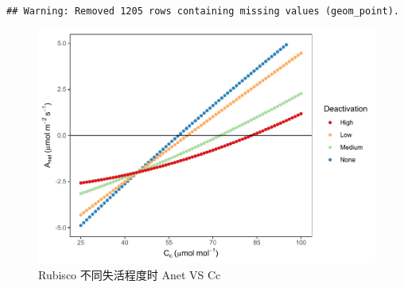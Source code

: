 \documentclass[
]{krantz}
\begin{document}
\begin{verbatim}
## Warning: Removed 1205 rows containing missing values (geom_point).
\end{verbatim}

\begin{figure}
\centering
\includegraphics{bookdown_files/figure-latex/anetdeccc-1.pdf}
\caption{\label{fig:anetdeccc}Rubisco 不同失活程度时 Anet VS Cc}
\end{figure}
\end{document}

